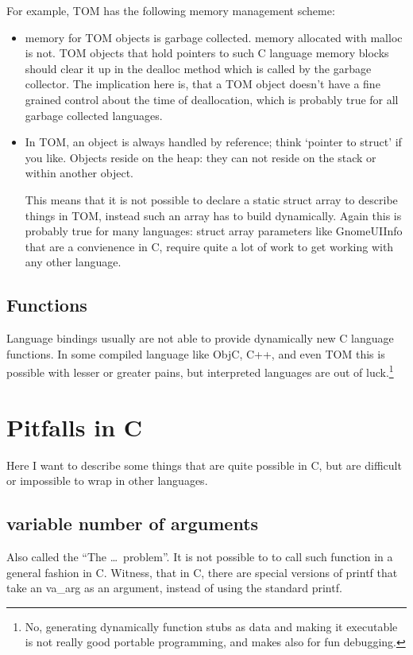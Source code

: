 \documentclass{article}
\begin{document}
For example, TOM has the following memory management scheme:
\begin{itemize}
\item memory for TOM objects is garbage collected. memory allocated
      with malloc is not. TOM objects that hold pointers to such C
      language memory blocks should clear it up in the dealloc method
      which is called by the garbage collector.
      The implication here is, that a TOM object doesn't have a fine
      grained control about the time of deallocation, which is
      probably true for all garbage collected languages.
\item 
        In TOM, an object is always handled by reference; think `pointer
        to struct' if you like.  Objects reside on the heap: they can not
        reside on the stack or within another object.

      This means that it is not possible to declare a static struct array to
      describe things in TOM, instead such an array has to build
      dynamically. Again this is probably true for many languages:
      struct array parameters like GnomeUIInfo that are a convienence
      in C, require quite a lot of work to get working with any other language.
\end{itemize}

\subsection{Functions}

Language bindings usually are not able to provide dynamically new C
language functions. In some compiled language like ObjC, C++, and even
TOM this is possible with lesser or greater pains, but interpreted
languages are out of luck.\footnote{No, generating dynamically
function stubs as data and making it executable is not really good
portable programming, and makes also for fun debugging.}

\section{Pitfalls in C}

Here I want to describe some things that are quite possible in C, but
are difficult or impossible to wrap in other languages.

\subsection{variable number of arguments}
Also called the ``The \dots\ problem''. It is not possible to to call
such function in a general fashion in C. Witness, that in C, there are
special versions of printf that take an va\_arg as an argument,
instead of using the standard printf.
\end{document}
